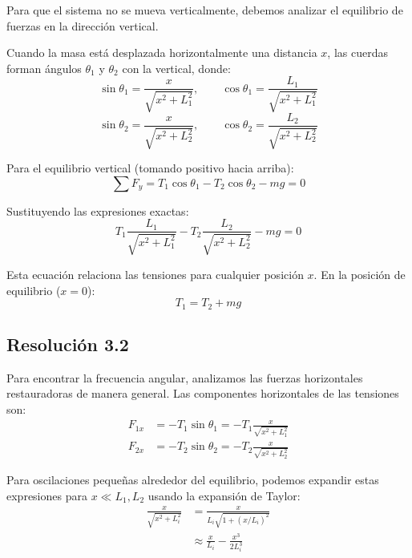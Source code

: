 \documentclass[
  11pt,
  letterpaper,
   addpoints,
   answers
  ]{exam}
\begin{document}
\begin{questions}
\begin{solution}
Para que el sistema no se mueva verticalmente, debemos analizar el equilibrio de fuerzas en la dirección vertical.

Cuando la masa está desplazada horizontalmente una distancia $x$, las cuerdas forman ángulos $\theta_1$ y $\theta_2$ con la vertical, donde:
\begin{equation}
\sin\theta_1 = \frac{x}{\sqrt{x^2 + L_1^2}}, \qquad \cos\theta_1 = \frac{L_1}{\sqrt{x^2 + L_1^2}}
\end{equation}
\begin{equation}
\sin\theta_2 = \frac{x}{\sqrt{x^2 + L_2^2}}, \qquad \cos\theta_2 = \frac{L_2}{\sqrt{x^2 + L_2^2}}
\end{equation}

Para el equilibrio vertical (tomando positivo hacia arriba):
\begin{equation}
\sum F_y = T_1\cos\theta_1 - T_2\cos\theta_2 - mg = 0
\end{equation}

Sustituyendo las expresiones exactas:
\begin{equation}
T_1 \frac{L_1}{\sqrt{x^2 + L_1^2}} - T_2 \frac{L_2}{\sqrt{x^2 + L_2^2}} - mg = 0
\end{equation}

Esta ecuación relaciona las tensiones para cualquier posición $x$. En la posición de equilibrio ($x = 0$):
\begin{equation}
\boxed{T_1 = T_2 + mg}
\end{equation}

\subsection*{Resolución 3.2}

Para encontrar la frecuencia angular, analizamos las fuerzas horizontales restauradoras de manera general. Las componentes horizontales de las tensiones son:
\begin{align}
F_{1x} &= -T_1\sin\theta_1 = -T_1 \frac{x}{\sqrt{x^2 + L_1^2}} \\
F_{2x} &= -T_2\sin\theta_2 = -T_2 \frac{x}{\sqrt{x^2 + L_2^2}}
\end{align}

Para oscilaciones pequeñas alrededor del equilibrio, podemos expandir estas expresiones para $x \ll L_1, L_2$ usando la expansión de Taylor:
\begin{align}
\frac{x}{\sqrt{x^2 + L_i^2}} &= \frac{x}{L_i\sqrt{1 + (x/L_i)^2}} \\
&\approx \frac{x}{L_i} - \frac{x^3}{2L_i^3}
\end{align}


\end{solution}
\end{questions}
\end{document}
